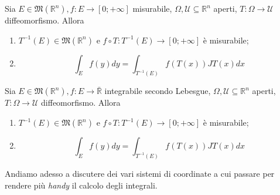 \begin{theorem}
	Sia $E \in \mathfrak{M}(\mathbb{R}^n), f: E \to [0; +\infty]$ misurabile, $\Omega, \mathcal{U} \subseteq \mathbb{R}^n$ aperti, $T: \Omega \to \mathcal{U}$ diffeomorfismo. Allora
	\begin{enumerate}[label=\protect\circled{\arabic*}]
		\item $T^{-1}(E) \in \mathfrak{M}(\mathbb{R}^n)$ e $f \circ T: T^{-1}(E) \to [0; +\infty]$ è misurabile;
		\item $$\int_E f(y)dy = \int_{T^{-1}(E)} f(T(x))JT(x)dx$$
	\end{enumerate}
\end{theorem}
\begin{theorem}
	Sia $E \in \mathfrak{M}(\mathbb{R}^n), f: E \to \bar{\mathbb{R}}$ integrabile secondo Lebesgue, $\Omega, \mathcal{U} \subseteq \mathbb{R}^n$ aperti, $T: \Omega \to \mathcal{U}$ diffeomorfismo. Allora
	\begin{enumerate}[label=\protect\circled{\arabic*}]
		\item $T^{-1}(E) \in \mathfrak{M}(\mathbb{R}^n)$ e $f \circ T: T^{-1}(E) \to [0; +\infty]$ è misurabile;
		\item $$\int_E f(y)dy = \int_{T^{-1}(E)} f(T(x))JT(x)dx$$
	\end{enumerate}
\end{theorem}
Andiamo adesso a discutere dei vari sistemi di coordinate a cui passare per rendere più \emph{handy} il calcolo degli integrali.
